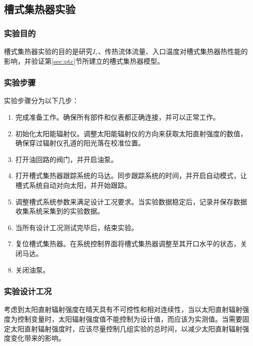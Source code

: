 \subsection{槽式集热器实验}
\subsubsection{实验目的}
槽式集热器实验的目的是研究$I_r$、传热流体流量、入口温度对槽式集热器热性能的影响，并验证第\ref{sec:ptc}节所建立的槽式集热器模型。

\subsubsection{实验步骤}
实验步骤分为以下几步：
\begin{enumerate}[label=(\arabic*)]
	\item 完成准备工作。确保所有部件和仪表都正确连接，并可以正常工作。
	\item 初始化太阳能辐射仪。调整太阳能辐射仪的方向来获取太阳直射强度的数值，确保穿过辐射仪孔道的阳光落在校准位置。
	\item 打开油回路的阀门，并开启油泵。
	\item 打开槽式集热器跟踪系统的马达。同步跟踪系统的时间，并开启自动模式，让槽式系统自动对向太阳，并开始跟踪。
	\item 调整槽式系统参数来满足设计工况要求。当实验数据稳定后，记录并保存数据收集系统采集到的实验数据。
	\item 当所有设计工况测试完毕后，结束实验。
	\item 复位槽式集热器。在系统控制界面将槽式集热器调整至其开口水平的状态，关闭马达。
	\item 关闭油泵。
\end{enumerate}

\subsubsection{实验设计工况}

考虑到太阳直射辐射强度在晴天具有不可控性和相对连续性，当以太阳直射辐射强度为控制变量时，太阳辐射强度值不能控制为设计值，而应该为实测值。当需要固定太阳直射辐射强度时，应该尽量控制几组实验的总时间，以减少太阳直射辐射强度变化带来的影响。

